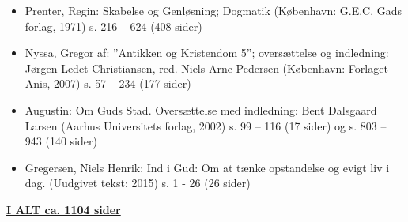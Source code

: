\begin{itemize}
\item Prenter, Regin: Skabelse og Genløsning; Dogmatik (København: G.E.C. Gads forlag, 1971) s. 216 – 624 (408 sider) 
\item Nyssa, Gregor af: ”Antikken og Kristendom 5”; oversættelse og indledning: Jørgen Ledet Christiansen, red. Niels Arne Pedersen (København: Forlaget Anis, 2007) s. 57 – 234 (177 sider)  
\item Augustin: Om Guds Stad.  Oversættelse med indledning: Bent Dalsgaard Larsen (Aarhus Universitets forlag, 2002) s. 99 – 116 (17 sider) og s. 803 – 943 (140 sider)
\item Gregersen, Niels Henrik: Ind i Gud: Om at tænke opstandelse og evigt liv i dag. (Uudgivet tekst: 2015) s. 1 - 26 (26 sider)
\end{itemize}

\textbf{\underline{\large I ALT ca. 1104 sider}}